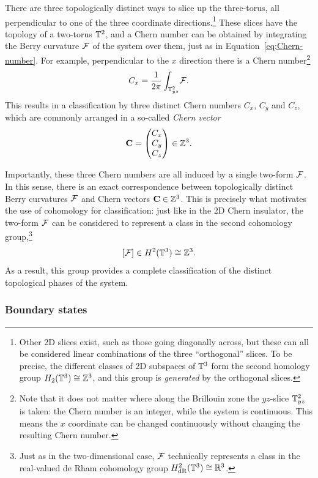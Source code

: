 There are three topologically distinct ways to slice up the three-torus, all perpendicular to one of the three coordinate directions.\footnote{
	Other 2D slices exist, such as those going diagonally across, but these can all be considered linear combinations of the three ``orthogonal'' slices. To be precise, the different classes of 2D subspaces of $\mathbb{T}^3$ form the second homology group $H_2(\mathbb{T}^3)\cong\mathbb{Z}^3$, and this group is \emph{generated} by the orthogonal slices.}
These slices have the topology of a two-torus $\mathbb{T}^2$, and a Chern number can be obtained by integrating the Berry curvature $\mathcal{F}$ of the system over them, just as in Equation~\eqref{eq:Chern-number}. For example, perpendicular to the $x$ direction there is a Chern number\footnote{
	Note that it does not matter where along the Brillouin zone the $yz$-slice $\mathbb{T}_{yz}^2$ is taken: the Chern number is an integer, while the system is continuous. This means the $x$ coordinate can be changed continuously without changing the resulting Chern number.}
\begin{equation*}
	C_{x} = \frac{1}{2\pi}\int_{\mathbb{T}_{yz}^2}\!\mathcal{F}.
\end{equation*}
This results in a classification by three distinct Chern numbers $C_x$, $C_y$ and $C_z$, which are commonly arranged in a so-called \emph{Chern vector}
\[
	\vb{C} = \begin{pmatrix}
		C_x \\ C_y \\ C_z
	\end{pmatrix} \in \mathbb{Z}^3.
\]

Importantly, these three Chern numbers are all induced by a single two-form $\mathcal{F}$. In this sense, there is an exact correspondence between topologically distinct Berry curvatures $\mathcal{F}$ and Chern vectors $\vb{C}\in\mathbb{Z}^3$. This is precisely what motivates the use of cohomology for classification: just like in the 2D Chern insulator, the two-form $\mathcal{F}$ can be considered to represent a class in the second cohomology group,\footnote{
	Just as in the two-dimensional case, $\mathcal{F}$ technically represents a class in the real-valued de Rham cohomology group $H_{\rm dR}^2(\mathbb{T}^3)\cong\mathbb{R}^3$.}
\begin{equation}\label{eq:2nd-cohom-t3}
	[\mathcal{F}]\in H^2(\mathbb{T}^3)\cong\mathbb{Z}^3. 
\end{equation}
As a result, this group provides a complete classification of the distinct topological phases of the system.

\subsubsection{Boundary states}

